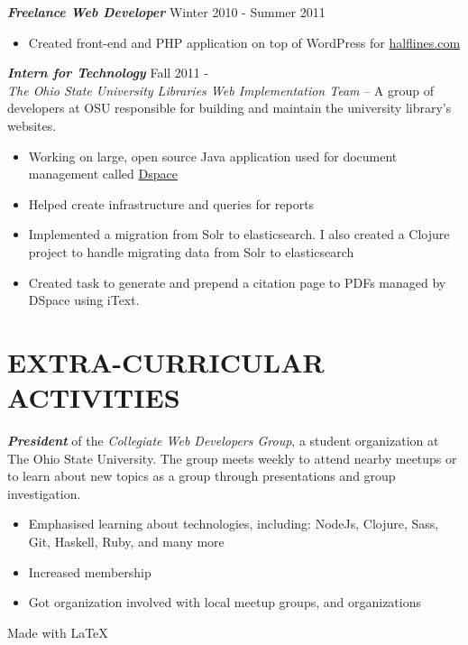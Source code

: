 \documentclass[line,letterpaper]{resume}
\begin{document}
\begin{resume}
    {\sl\textbf{Freelance Web Developer}} \hfill Winter 2010 - Summer 2011\\
    \vspace{-8pt}
    \begin{itemize}  
        \item Created front-end and PHP application on top of WordPress for
            \href{http://halflines.com/}{halflines.com}
    \end{itemize} 
    {\sl\textbf{Intern for Technology}} \hfill Fall 2011 - \\
    \emph{The Ohio State University Libraries Web Implementation Team} -- A
    group of developers at OSU responsible for building and maintain the
    university library's websites.
    \begin{itemize}  
        \item Working on large, open source Java application used for document
        management called
        \href{https://github.com/osulibraries/DSpaceOSUKB/wiki}{Dspace}
        \item Helped create infrastructure and queries for reports
        \item Implemented a migration from Solr to elasticsearch. I also created
            a Clojure project to handle migrating data from Solr to
            elasticsearch
        \item Created task to generate and prepend a citation page to PDFs
            managed by DSpace using iText.
    \end{itemize} 

    \vspace{-6pt}

    \section{\uppercase{Extra-Curricular Activities}}             
    \emph{\textbf{President}} of the \emph{Collegiate Web Developers Group}, a
    student organization at The Ohio State University. The group meets weekly to
    attend nearby meetups or to learn about new topics as a group through
    presentations and group investigation.
    \begin{itemize}
        \item Emphasised learning about technologies, including:
            NodeJs, Clojure, Sass, Git, Haskell, Ruby, and many more
        \item Increased membership
        \item Got organization involved with local meetup groups, and
            organizations
    \end{itemize}

\end{resume}
\hfill Made with \LaTeX{}
\end{document}

